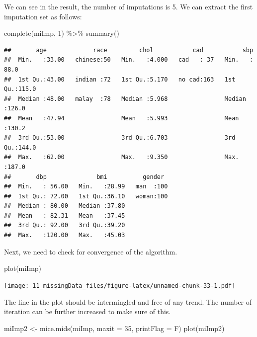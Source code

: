 \documentclass[
  10pt,
]{krantz}
\newenvironment{Shaded}{\begin{snugshade}}{\end{snugshade}}
\newcommand{\AttributeTok}[1]{\textcolor[rgb]{0.77,0.63,0.00}{#1}}
\newcommand{\DecValTok}[1]{\textcolor[rgb]{0.00,0.00,0.81}{#1}}
\newcommand{\FunctionTok}[1]{\textcolor[rgb]{0.00,0.00,0.00}{#1}}
\newcommand{\NormalTok}[1]{#1}
\newcommand{\OtherTok}[1]{\textcolor[rgb]{0.56,0.35,0.01}{#1}}
\newcommand{\SpecialCharTok}[1]{\textcolor[rgb]{0.00,0.00,0.00}{#1}}
\begin{document}
We can see in the result, the number of imputations is 5. We can extract the first imputation set as follows:

\begin{Shaded}
\begin{Highlighting}[]
\FunctionTok{complete}\NormalTok{(miImp, }\DecValTok{1}\NormalTok{) }\SpecialCharTok{\%\textgreater{}\%} 
  \FunctionTok{summary}\NormalTok{()}
\end{Highlighting}
\end{Shaded}

\begin{verbatim}
##       age             race         chol           cad           sbp       
##  Min.   :33.00   chinese:50   Min.   :4.000   cad   : 37   Min.   : 88.0  
##  1st Qu.:43.00   indian :72   1st Qu.:5.170   no cad:163   1st Qu.:115.0  
##  Median :48.00   malay  :78   Median :5.968                Median :126.0  
##  Mean   :47.94                Mean   :5.993                Mean   :130.2  
##  3rd Qu.:53.00                3rd Qu.:6.703                3rd Qu.:144.0  
##  Max.   :62.00                Max.   :9.350                Max.   :187.0  
##       dbp              bmi          gender   
##  Min.   : 56.00   Min.   :28.99   man  :100  
##  1st Qu.: 72.00   1st Qu.:36.10   woman:100  
##  Median : 80.00   Median :37.80              
##  Mean   : 82.31   Mean   :37.45              
##  3rd Qu.: 92.00   3rd Qu.:39.20              
##  Max.   :120.00   Max.   :45.03
\end{verbatim}

Next, we need to check for convergence of the algorithm.

\begin{Shaded}
\begin{Highlighting}[]
\FunctionTok{plot}\NormalTok{(miImp)}
\end{Highlighting}
\end{Shaded}

\texttt{[image: 11\_missingData\_files/figure-latex/unnamed-chunk-33-1.pdf]}

The line in the plot should be intermingled and free of any trend. The number of iteration can be further increased to make sure of this.

\begin{Shaded}
\begin{Highlighting}[]
\NormalTok{miImp2 }\OtherTok{\textless{}{-}} \FunctionTok{mice.mids}\NormalTok{(miImp, }\AttributeTok{maxit =} \DecValTok{35}\NormalTok{, }\AttributeTok{printFlag =}\NormalTok{ F)}
\FunctionTok{plot}\NormalTok{(miImp2)}
\end{Highlighting}
\end{Shaded}
\end{document}
